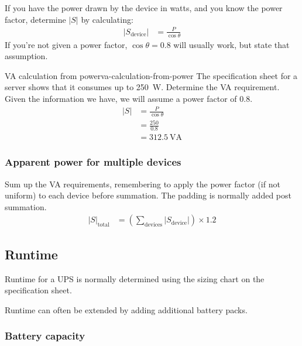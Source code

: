 \documentclass{pgnotes}
\begin{document}
If you have the power drawn by the device in watts, and you know the power factor, determine $\left \lvert S \right \rvert$ by calculating:
\begin{align}
   \left \lvert S_{\mbox{device}} \right \rvert & = \frac{P}{\cos \theta }
\end{align}
If you're not given a power factor, $\cos \theta = 0.8$ will usually work, but state that assumption.

\begin{example}{VA calculation from power}{va-calculation-from-power}
  The specification sheet for a server shows that it consumes up to \SI{250}{\watt}.
  Determine the VA requirement.
  \tcblower
  Given the information we have, we will assume a power factor of 0.8.
  \begin{align}
    \left \lvert S \right \rvert & = \frac{P}{\cos \theta} \\
                                 & = \frac{250}{0.8} \\
                                 & = \SI{312.5}{\volt\ampere}
  \end{align}
\end{example}


\subsubsection{Apparent power for multiple devices}

Sum up the VA requirements, remembering to apply the power factor (if not uniform) to each device before summation.
The padding is normally added post summation. 
\begin{align}
  \left \lvert S \right \rvert _{\mbox{total}} & = \left ( \sum_{\mbox{devices}} \left \lvert S_{\mbox{device}} \right \rvert \right ) \times 1.2
\end{align}

\subsection{Runtime}

Runtime for a UPS is normally determined using the sizing chart on the specification sheet.

Runtime can often be extended by adding additional battery packs.

\subsubsection{Battery capacity}
\end{document}
